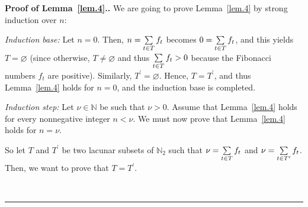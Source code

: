 \documentclass[numbers=enddot,12pt,final,onecolumn,notitlepage]{scrartcl}%
\numberwithin{exer}{section}
\theoremstyle{definition}
\newenvironment{proof}[1][Proof]{\noindent\textbf{#1.} }{\ \rule{0.5em}{0.5em}}
\let\sumnonlimits\sum
\renewcommand{\sum}{\sumnonlimits\limits}
\begin{document}
\begin{proof}[Proof of Lemma~\ref{lem.4}.] We are going to prove Lemma~\ref{lem.4} by strong induction
over $n$:

\textit{Induction base:} Let $n=0$. Then, $n=\sum\limits_{t\in T}f_{t}$
becomes $0=\sum\limits_{t\in T}f_{t}$, and this yields $T=\varnothing$ (since
otherwise, $T\neq\varnothing$ and thus $\sum\limits_{t\in T}f_{t}>0$ because
the Fibonacci numbers $f_{t}$ are positive). Similarly, $T^{\prime
}=\varnothing$. Hence, $T=T^{\prime}$, and thus Lemma~\ref{lem.4} holds for $n=0$, and
the induction base is completed.

\textit{Induction step:} Let $\nu\in\mathbb{N}$ be such that $\nu>0$. Assume
that Lemma~\ref{lem.4} holds for every nonnegative integer $n<\nu$. We must now prove
that Lemma~\ref{lem.4} holds for $n=\nu$.

So let $T$ and $T^{\prime}$ be two lacunar subsets of $\mathbb{N}_{2}$ such
that $\nu=\sum\limits_{t\in T}f_{t}$ and $\nu=\sum\limits_{t\in T^{\prime}%
}f_{t}$. Then, we want to prove that $T=T^{\prime}$.


\end{proof}
\end{document}
